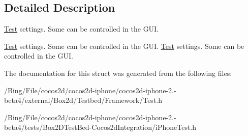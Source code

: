 \subsection{Detailed Description}
\hyperlink{class_test}{Test} settings. Some can be controlled in the G\-U\-I. 

\hyperlink{class_test}{Test} settings. Some can be controlled in the G\-U\-I. \hyperlink{class_test}{Test} settings. Some can be controlled in the G\-U\-I. 

The documentation for this struct was generated from the following files\-:\begin{DoxyCompactItemize}
\item 
/\-Bing/\-File/cocos2d/cocos2d-\/iphone/cocos2d-\/iphone-\/2.-\/beta4/external/\-Box2d/\-Testbed/\-Framework/Test.\-h\item 
/\-Bing/\-File/cocos2d/cocos2d-\/iphone/cocos2d-\/iphone-\/2.-\/beta4/tests/\-Box2\-D\-Test\-Bed-\/\-Cocos2d\-Integration/i\-Phone\-Test.\-h\end{DoxyCompactItemize}
